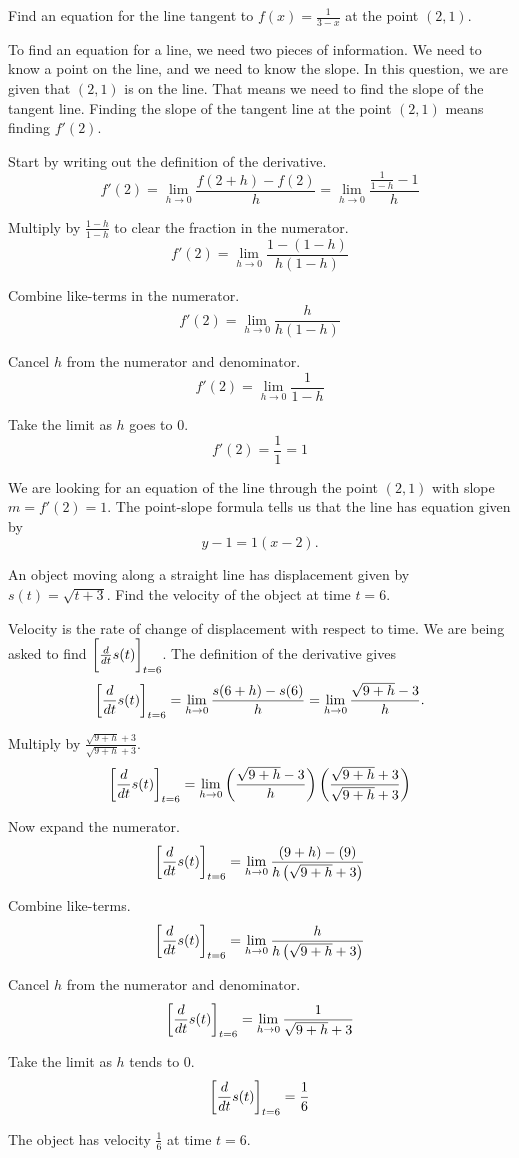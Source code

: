 \PassOptionsToClass{tikzexport}{ximera}\nonstopmode\documentclass{ximera}
\begin{document}
\begin{example}
	Find an equation for the line tangent to $f(x) = \frac{1}{3-x}$ at the point $(2, 1)$.
	\begin{explanation}
		To find an equation for a line, we need two pieces of information.  We need to know
		a point on the line, and we need to know the slope.  In this question, we are given
		that $(2,1)$ is on the line.  That means we need to find the slope of the tangent line.
		Finding the slope of the tangent line at the point $(2,1)$ means finding $f'(2)$.
		
		Start by writing out the definition of the derivative.
		\[ f'(2) = \lim_{h\to 0} \frac{f(2+h)-f(2)}{h} = \lim_{h\to 0} \frac{\frac{1}{1-h} - 1}{h} \]

		Multiply by $\frac{1-h}{1-h}$ to clear the fraction in the numerator.
		\[ f'(2) = \lim_{h\to 0} \frac{1 - (1-h)}{h(1-h)} \]

		Combine like-terms in the numerator.
		\[ f'(2) = \lim_{h\to 0} \frac{h}{h(1-h)} \]

		Cancel $h$ from the numerator and denominator.
		\[ f'(2) = \lim_{h\to 0} \frac{1}{1-h} \]
		
		Take the limit as $h$ goes to $0$. 
		\[ f'(2) = \frac{1}{1} = 1 \]

		We are looking for an equation of the line through the point $(2,1)$ with slope $m = f'(2) = 1$.
		The point-slope formula tells us that the line has equation given by
		\[ y-1 = 1(x-2). \]	
	\end{explanation}
\end{example}

\begin{example}
	An object moving along a straight line has displacement given by $s(t) = \sqrt{t+3}$.  Find the velocity of the
	object at time $t=6$.
	\begin{explanation}
		Velocity is the rate of change of displacement with respect to time.  We are being asked to
		find $\bigg[ \frac{d }{d t} s(t) \bigg]_{t=6}$.
		The definition of the derivative gives
		\[ \eval{\dd{t} s(t)}_{t=6} = \lim_{h \to 0} \frac{s(6+h)-s(6)}{h} = \lim_{h\to 0} \frac{\sqrt{9+h}-3}{h}. \]
		
		Multiply by $\frac{\sqrt{9+h}+3}{\sqrt{9+h}+3}$.
		\[ \eval{\dd{t} s(t)}_{t=6} = \lim_{h\to 0} \left(\frac{\sqrt{9+h}-3}{h} \right)\left( \frac{\sqrt{9+h}+3}{\sqrt{9+h}+3} \right) \]		
		
		Now expand the numerator.		
		\[ \eval{\dd{t} s(t)}_{t=6} = \lim_{h \to 0} \frac{(9+h) - (9)}{h\left(\sqrt{9+h}+3 \right)} \]

		Combine like-terms.
		\[ \eval{\dd{t} s(t)}_{t=6} = \lim_{h \to 0} \frac{h}{h\left(\sqrt{9+h}+3\right)} \]

		Cancel $h$ from the numerator and denominator.
		\[ \eval{\dd{t} s(t)}_{t=6} = \lim_{h\to 0} \frac{1}{\sqrt{9+h}+3} \]

		Take the limit as $h$ tends to $0$.
		\[ \bigg[ \frac{d }{d t} s(t) \bigg]_{t=6} = \frac{1}{6} \]
	
		The object has velocity $\frac{1}{6}$ at time $t=6$.
	\end{explanation}
\end{example}
\end{document}
